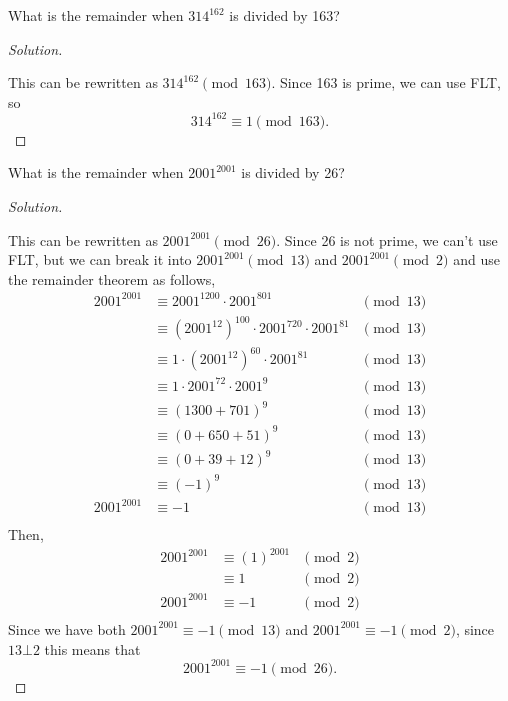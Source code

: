 \documentclass[11pt]{article}
\newenvironment{problem}[2][Problem]{\begin{trivlist}
\item[\hskip \labelsep {\bfseries #1}\hskip \labelsep {\bfseries #2.}]}{\end{trivlist}}
\newenvironment{solution}
  {\renewcommand\qedsymbol{$~$}\begin{proof}[Solution]$ $\par\nobreak\ignorespaces}
  {\end{proof}}
\begin{document}
\begin{problem}{6}
What is the remainder when $314^{162}$ is divided by 163?
\end{problem}

\begin{solution}
    This can be rewritten as $314^{162} \pmod{163}$. Since 163 is prime, we can use FLT, so
    \[
        314^{162} \equiv 1\pmod{163}.
    \]
\end{solution}



\begin{problem}{8}
What is the remainder when $2001^{2001}$ is divided by 26?
\end{problem}

\begin{solution}
    This can be rewritten as $2001^{2001} \pmod{26}$. Since 26 is not prime, we can't use FLT, but we can break it into $2001^{2001} \pmod{13}$ and $2001^{2001} \pmod{2}$ and use the remainder theorem as follows,
    \[
        \begin{array}{rlc}
            2001^{2001} & \equiv 2001^{1200} \cdot 2001^{801}                                  & \pmod{13} \\
                        & \equiv \left(2001^{12}\right)^{100} \cdot 2001^{720} \cdot 2001^{81} & \pmod{13} \\
                        & \equiv 1 \cdot \left(2001^{12}\right)^{60} \cdot 2001^{81}           & \pmod{13} \\
                        & \equiv 1 \cdot 2001^{72} \cdot 2001^{9}                              & \pmod{13} \\
                        & \equiv (1300 + 701)^{9}                                              & \pmod{13} \\
                        & \equiv (0 + 650 +51)^{9}                                             & \pmod{13} \\
                        & \equiv (0 + 39 + 12)^{9}                                             & \pmod{13} \\
                        & \equiv (-1)^{9}                                                      & \pmod{13} \\
            2001^{2001} & \equiv -1                                                            & \pmod{13} \\
        \end{array}
    \]
    Then,
    \[
        \begin{array}{rlc}
            2001^{2001} & \equiv (1)^{2001} & \pmod{2} \\
                        & \equiv 1          & \pmod{2} \\
            2001^{2001} & \equiv -1         & \pmod{2} \\
        \end{array}
    \]
    Since we have both $2001^{2001}\equiv -1 \pmod{13}$ and $2001^{2001}\equiv -1 \pmod{2}$, since $13\bot 2$ this means that
    \[
        2001^{2001}\equiv -1 \pmod{26}.
    \]
\end{solution}
\end{document}
